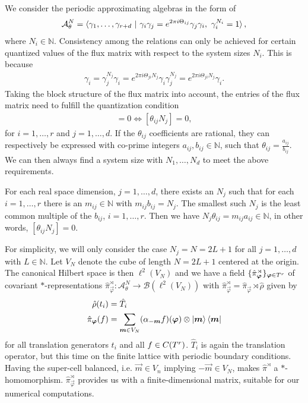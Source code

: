 \documentclass[submission, Phys]{SciPost}
\begin{document}
We consider the periodic approximating algebras in the form of \cite[Ch. 4.4]{Prodan2017}
\begin{align}
    \mathcal{A}_\theta^N
    = \braket{\gamma_1,\ldots, \gamma_{r+d} ~|~ 
    \gamma_i \gamma_j =  e^{2\pi i \Theta_{ij}}
    \gamma_j \gamma_i,~ \gamma_i^{N_i}=1},
\end{align}
where $N_i \in \mathbb{N}$.
Consistency among the relations can only be achieved for certain quantized values of the flux matrix with respect to the system sizes $N_i$.
This is because
\begin{align}
   \gamma_i = \gamma_j^{N_j} \gamma_i =  e^{2\pi i \Theta_{ji} N_j} \gamma_i  \gamma_j^{N_j}  = e^{2\pi i \Theta_{ji} N_j} \gamma_i .
\end{align}
Taking the block structure of the flux matrix into account, the entries of the flux matrix need to fulfill the quantization condition
\begin{align}
   [ \Theta_{ji} N_j]=0 \Leftrightarrow [\theta_{ij} N_j] = 0,
\end{align}
for $i=1,\ldots,r$ and $j =1,\ldots,d$.
If the $\theta_{ij}$ coefficients are rational, they can respectively be expressed with co-prime integers $a_{ij}, b_{ij}\in\mathbb{N}$, such that $\theta_{ij}=\frac{a_{ij}}{b_{ij}}$. We can then always find a system size with $N_1,\dots, N_d$ to meet the above requirements.

For each real space dimension, $j=1,\dots,d$, there exists an $N_j$ such that for each $i=1,\dots,r$ there is an $m_{ij}\in\mathbb{N}$ with $m_{ij} b_{ij}=N_j$. The smallest such $N_j$ is the least common multiple of the $b_{ij}$, $i=1,\dots,r$. 
Then we have $N_j\theta_{ij}=m_{ij} a_{ij} \in \mathbb{N}$, in other words, $[\theta_{ij} N_j] = 0$.

For simplicity, we will only consider the case $N_j = N = 2L+1$ for all $j =1,\ldots,d$ with $L\in\mathbb{N}$.
Let $V_N$ denote the cube of length $N=2L+1$ centered at the origin.
The canonical Hilbert space is then $\ell^2(V_N)$ and we have a field $\{\hat{\pi}^\rtimes_{\boldsymbol{\varphi}}\}_{\boldsymbol{\varphi}\in T^r}$ of covariant $\ast$-representations
$\hat{\pi}^\rtimes_{\vec{\varphi}} \colon\mathcal{A}_\theta^N \to \mathcal{B}(\ell^2(V_N)) $ with $\hat{\pi}^\rtimes_{\vec{\varphi}} = \hat{\pi}_{\vec{\varphi}} \rtimes \hat{\rho}$
given by
\begin{align}
     \hat{\rho}(t_i) &=  \hat{T}_i
     \\
     \hat{\pi}_{\boldsymbol{\varphi}}(f) &
     =\sum_{\boldsymbol{m} \in V_N} (\alpha_{-\boldsymbol{m}}f)(\boldsymbol{\varphi}) \otimes \ket{\boldsymbol{m}}\bra{\boldsymbol{m}}
\end{align}
for all translation generators $t_i$ and all $f \in C(T^r)$.
$\hat{T}_i$ is again the translation operator, but this time on the finite lattice with periodic boundary conditions.
Having the super-cell balanced, i.e. $\vec{m}\in V_n$ implying $-\vec{m}\in V_N$, makes $\hat{\pi}^\rtimes$ a $\ast$-homomorphism.
$\hat{\pi}^\rtimes_{\vec{\varphi}}$ provides us with a finite-dimensional matrix, suitable for our numerical computations.
\end{document}
